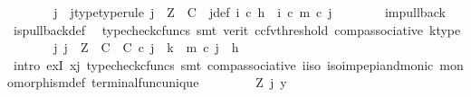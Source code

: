 \begin{isabellebody}
\ \ \ \ \isamarkupfalse%
\ \isamarkupfalse%
\ j\ \ j{\isacharunderscore}{\kern0pt}type{\isacharbrackleft}{\kern0pt}type{\isacharunderscore}{\kern0pt}rule{\isacharbrackright}{\kern0pt}{\isacharcolon}{\kern0pt}\ {\isachardoublequoteopen}j\ {\isacharcolon}{\kern0pt}\ Z\ {\isasymrightarrow}\ C{\isachardoublequoteclose}\ \ j{\isacharunderscore}{\kern0pt}def{\isacharcolon}{\kern0pt}\ {\isachardoublequoteopen}i\ {\isasymcirc}\isactrlsub c\ h\ {\isacharequal}{\kern0pt}\ {\isacharparenleft}{\kern0pt}i\ {\isasymcirc}\isactrlsub c\ m{\isacharparenright}{\kern0pt}\ {\isasymcirc}\isactrlsub c\ j{\isachardoublequoteclose}\isanewline
\ \ \ \ \ \ \isamarkupfalse%
\ {\isasymchi}im{\isacharunderscore}{\kern0pt}pullback\ \isamarkupfalse%
\ is{\isacharunderscore}{\kern0pt}pullback{\isacharunderscore}{\kern0pt}def\ \isamarkupfalse%
\ {\isacharparenleft}{\kern0pt}typecheck{\isacharunderscore}{\kern0pt}cfuncs{\isacharcomma}{\kern0pt}\ smt\ {\isacharparenleft}{\kern0pt}verit{\isacharcomma}{\kern0pt}\ ccfv{\isacharunderscore}{\kern0pt}threshold{\isacharparenright}{\kern0pt}\ comp{\isacharunderscore}{\kern0pt}associative{}\ k{\isacharunderscore}{\kern0pt}type{\isacharparenright}{\kern0pt}\isanewline
\ \ \ \ \isamarkupfalse%
\ \isamarkupfalse%
\ {\isachardoublequoteopen}{\isasymexists}j{\isachardot}{\kern0pt}\ j\ {\isacharcolon}{\kern0pt}\ Z\ {\isasymrightarrow}\ C\ {\isasymand}\ {\isasymbeta}\isactrlbsub C\isactrlesub \ {\isasymcirc}\isactrlsub c\ j\ {\isacharequal}{\kern0pt}\ k\ {\isasymand}\ m\ {\isasymcirc}\isactrlsub c\ j\ {\isacharequal}{\kern0pt}\ h{\isachardoublequoteclose}\isanewline
\ \ \ \ \ \ \isamarkupfalse%
\ {\isacharparenleft}{\kern0pt}intro\ exI{\isacharbrackleft}{\kern0pt}\ x{\isacharequal}{\kern0pt}j{\isacharbrackright}{\kern0pt}{\isacharcomma}{\kern0pt}\ typecheck{\isacharunderscore}{\kern0pt}cfuncs{\isacharcomma}{\kern0pt}\ smt\ comp{\isacharunderscore}{\kern0pt}associative{}\ i{\isacharunderscore}{\kern0pt}iso\ iso{\isacharunderscore}{\kern0pt}imp{\isacharunderscore}{\kern0pt}epi{\isacharunderscore}{\kern0pt}and{\isacharunderscore}{\kern0pt}monic\ monomorphism{\isacharunderscore}{\kern0pt}def{}\ terminal{\isacharunderscore}{\kern0pt}func{\isacharunderscore}{\kern0pt}unique{\isacharparenright}{\kern0pt}\isanewline
\ \ \isamarkupfalse%
\isanewline
\ \ \ \ \isamarkupfalse%
\ Z\ j\ y\isanewline
\ \ \ \ \isamarkupfalse%

\end{isabellebody}
